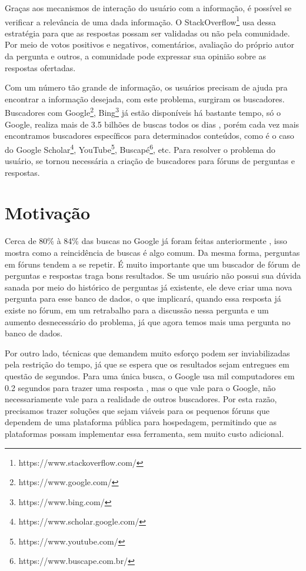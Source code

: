 Graças aos mecanismos de interação do usuário com a informação, é possível se verificar a relevância de uma dada informação. O StackOverflow\footnote{https://www.stackoverflow.com/} usa dessa estratégia para que as respostas possam ser validadas ou não pela comunidade. Por meio de votos positivos e negativos, comentários, avaliação do próprio autor da pergunta e outros, a comunidade pode expressar sua opinião sobre as respostas ofertadas.

Com um número tão grande de informação, os usuários precisam de ajuda pra encontrar a informação desejada, com este problema, surgiram os buscadores. Buscadores com Google\footnote{https://www.google.com/}, Bing\footnote{https://www.bing.com/} já estão disponíveis há bastante tempo, só o Google, realiza mais de 3.5 bilhões de buscas todos os dias \cite{googlesearch}, porém cada vez mais encontramos buscadores específicos para determinados conteúdos, como é o caso do Google Scholar\footnote{https://www.scholar.google.com/}, YouTube\footnote{https://www.youtube.com/}, Buscapé\footnote{https://www.buscape.com.br/}, etc. Para resolver o problema do usuário, se tornou necessária a criação de buscadores para fóruns de perguntas e respostas.


\section{Motivação}
Cerca de 80\% à 84\% das buscas no Google já foram feitas anteriormente \cite{googleexplained}, isso mostra como a reincidência de buscas é algo comum. Da mesma forma, perguntas em fóruns tendem a se repetir. É muito importante que um buscador de fórum de perguntas e respostas traga bons resultados. Se um usuário não possui sua dúvida sanada por meio do histórico de perguntas já existente, ele deve criar uma nova pergunta para esse banco de dados, o que implicará, quando essa resposta já existe no fórum, em um retrabalho para a discussão nessa pergunta e um aumento desnecessário do problema, já que agora temos mais uma pergunta no banco de dados.

Por outro lado, técnicas que demandem muito esforço podem ser inviabilizadas pela restrição do tempo, já que se espera que os resultados sejam entregues em questão de segundos. Para uma única busca, o Google usa mil computadores em 0.2 segundos para trazer uma resposta \cite{buildinggoogle}, mas o que vale para o Google, não necessariamente vale para a realidade de outros buscadores. Por esta razão, precisamos trazer soluções que sejam viáveis para os pequenos fóruns que dependem de uma plataforma pública para hospedagem, permitindo que as plataformas possam implementar essa ferramenta, sem muito custo adicional.

